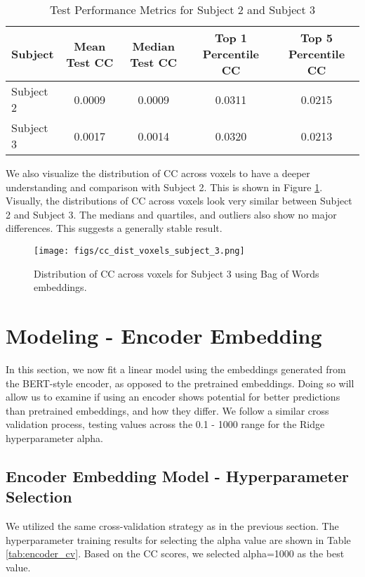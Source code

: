 \documentclass[10pt,letterpaper]{article}
\begin{document}
\begin{table}[ht]
  \centering
  \caption{Test Performance Metrics for Subject 2 and Subject 3}
  \label{tab:subject_performance}
  \begin{tabular}{lcccc}
    \hline
    \textbf{Subject} & \textbf{Mean Test CC} & \textbf{Median Test CC} & \textbf{Top 1 Percentile CC} & \textbf{Top 5 Percentile CC} \\
    \hline
    Subject 2        & 0.0009                & 0.0009                 & 0.0311                     & 0.0215                      \\
    Subject 3        & 0.0017                & 0.0014                 & 0.0320                     & 0.0213                      \\
    \hline
  \end{tabular}
\end{table}

We also visualize the distribution of CC across voxels to have a deeper understanding and comparison with Subject 2. This is shown in Figure \ref{fig:cc_dist_voxels_subject_3}. Visually, the distributions of CC across voxels look very similar between Subject 2 and Subject 3. The medians and quartiles, and outliers also show no major differences. This suggests a generally stable result.

\begin{figure}
    \centering
    \texttt{[image: figs/cc\_dist\_voxels\_subject\_3.png]}
    \caption{Distribution of CC across voxels for Subject 3 using Bag of Words embeddings.}
    \label{fig:cc_dist_voxels_subject_3}
\end{figure}


\section{Modeling - Encoder Embedding}

In this section, we now fit a linear model using the embeddings generated from the BERT-style encoder, as opposed to the pretrained embeddings. Doing so will allow us to examine if using an encoder shows potential for better predictions than pretrained embeddings, and how they differ. We follow a similar cross validation process, testing values across the 0.1 - 1000 range for the Ridge hyperparameter alpha.

\subsection{Encoder Embedding Model - Hyperparameter Selection}
We utilized the same cross-validation strategy as in the previous section. The hyperparameter training results for selecting the alpha value are shown in Table \ref{tab:encoder_cv}. Based on the CC scores, we selected alpha=1000 as the best value.
\end{document}
